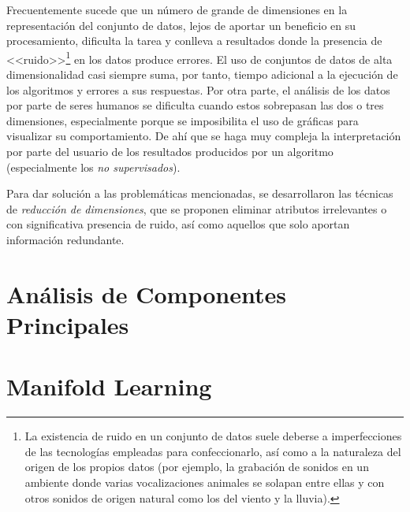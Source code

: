 Frecuentemente sucede que un número de grande de dimensiones en la representación del conjunto de datos, lejos de aportar un beneficio en su procesamiento, dificulta la tarea y conlleva a resultados donde la presencia de <<ruido>>\footnote{La existencia de ruido en un conjunto de datos suele deberse a imperfecciones de las tecnologías empleadas para confeccionarlo, así como a la naturaleza del origen de los propios datos (por ejemplo, la grabación de sonidos en un ambiente donde varias vocalizaciones animales se solapan entre ellas y con otros sonidos de origen natural como los del viento y la lluvia).} en los datos produce errores.
El uso de conjuntos de datos de alta dimensionalidad casi siempre suma, por tanto, tiempo adicional a la ejecución de los algoritmos y errores a sus respuestas.
Por otra parte, el análisis de los datos por parte de seres humanos se dificulta cuando estos sobrepasan las dos o tres dimensiones, especialmente porque se imposibilita el uso de gráficas para visualizar su comportamiento.
De ahí que se haga muy compleja la interpretación por parte del usuario de los resultados producidos por un algoritmo (especialmente los \textit{no supervisados}).

Para dar solución a las problemáticas mencionadas, se desarrollaron las técnicas de \textit{reducción de dimensiones}, que se proponen eliminar atributos irrelevantes o con significativa presencia de ruido, así como aquellos que solo aportan información redundante.

\section{Análisis de Componentes Principales}\label{subsec:PCA}


\section{Manifold Learning}\label{sec:manifoldLearning}
